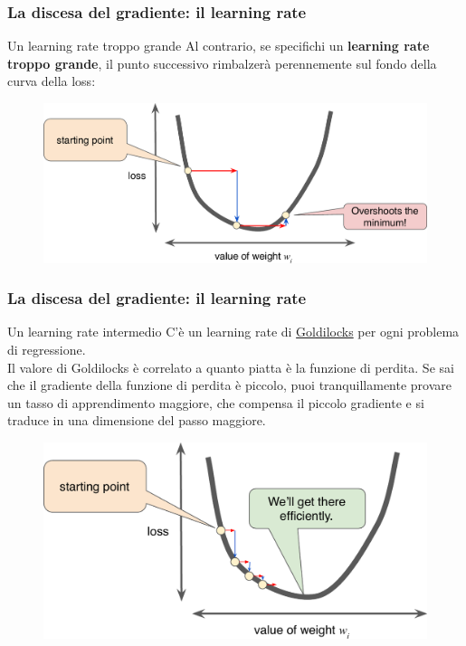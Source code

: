 \begin{frame}

	\frametitle{La discesa del gradiente: il learning rate}

	\begin{block}{Un learning rate troppo grande}
		Al contrario, se specifichi un \textbf{learning rate troppo grande}, il punto successivo rimbalzerà perennemente sul fondo della curva della loss:

		\begin{figure}[!htbp]
			\centering
			\includegraphics[height=0.4\linewidth]{images/supervised/training_reducing_loss/LearningRateTooLarge.pdf}
		\end{figure}
	\end{block}

\end{frame}


\begin{frame}

	\frametitle{La discesa del gradiente: il learning rate}

	\begin{block}{Un learning rate intermedio}
		C'è un learning rate di \href{https://en.wikipedia.org/wiki/Goldilocks_principle}{Goldilocks} per ogni problema di regressione.\\
		Il valore di Goldilocks è correlato a quanto piatta è la funzione di perdita. Se sai che il gradiente della funzione di perdita è piccolo, puoi tranquillamente provare un tasso di apprendimento maggiore, che compensa il piccolo gradiente e si traduce in una dimensione del passo maggiore.

		\begin{figure}[!htbp]
			\centering
			\includegraphics[height=0.25\linewidth]{images/supervised/training_reducing_loss/LearningRateJustRight.pdf}
		\end{figure}
	\end{block}

\end{frame}


